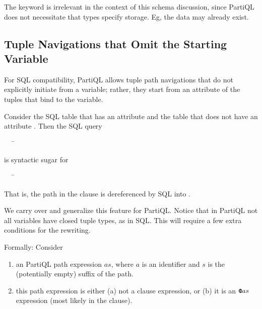 {The keyword  is irrelevant in the context of this schema discussion,
since PartiQL does not necessitate that types specify storage. Eg, the data may
already exist.

\subsection{Tuple Navigations that Omit the Starting Variable}
\label{sec:paths-with-no-starting-variable}
For SQL compatibility, PartiQL allows tuple path navigations that do not
explicitly initiate from a variable; rather, they start from an attribute of the
tuples that bind to the variable. 

\begin{example}
\label{xmpl:sql-attribute-dereferencing}
Consider the SQL table  that has an attribute  and the table 
that does not have an attribute . Then the SQL query
\begin{tabbing}
\ \ \ \=\\
\>
\end{tabbing}
\noindent is syntactic sugar for
\begin{tabbing}
\ \ \ \=\\
\>
\end{tabbing}
That is, the path  in the  clause is dereferenced by SQL into
.
\end{example}

We carry over and generalize this feature for PartiQL. Notice that in PartiQL
not all variables have closed tuple types, as in SQL. This will require a few
extra conditions for the rewriting.

Formally: Consider 
\begin{enumerate}
\item an PartiQL path expression $a s$, where $a$ is an identifier and $s$ is
the (potentially empty) suffix of the path. 

\item this path expression is either (a) not a  clause expression, or
(b) it is an $\texttt{\textbf{@}}as$ expression (most likely in the  clause).


\end{enumerate}}

